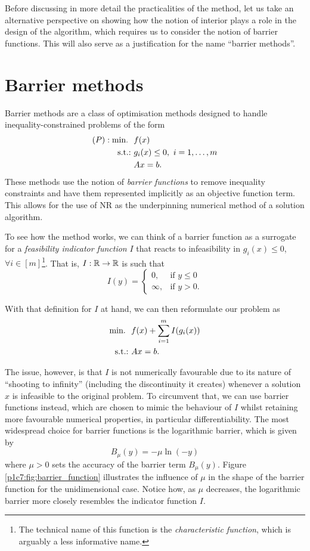Before discussing in more detail the practicalities of the method, let us take an alternative perspective on showing how the notion of interior plays a role in the design of the algorithm, which requires us to consider the notion of barrier functions. This will also serve as a justification for the name ``barrier methods''. 
	
	
\section{Barrier methods}


Barrier methods are a class of optimisation methods designed to handle inequality-constrained problems of the form
	\begin{align*}
	(P) : \mathop{\text{min.~}} \ & f(x) \\
	\mathop{\text{s.t.:~}} & g_i(x) \leq 0, \ i = 1,\dots,m \\
	& Ax = b. 
	\end{align*}
	These methods use the notion of \emph{barrier functions} to remove inequality constraints and have them represented implicitly as an objective function term. This allows for the use of NR as the underpinning numerical method of a solution algorithm. 
	
To see how the method works, we can think of a barrier function as a surrogate for a \emph{feasibility indicator function} $I$ that reacts to infeasibility in $g_i(x) \leq 0$, $\forall i \in  [m]$\footnote{The technical name of this function is the \emph{characteristic function}, which is arguably a less informative name.}. That is, $I : \mathbb{R} \to \mathbb{R}$ is such that
	\begin{equation*}
	I(y) = \begin{cases} 0, &\text{if } y \leq 0 \\
	                     \infty, &\text{if } y > 0.  
	       \end{cases}
	\end{equation*} 

With that definition for $I$ at hand, we can then reformulate our problem as	
	\begin{align*}
		\mathop{\text{min.~}} \ & f(x) + \sum_{i=1}^m I(g_i(x)) \\
		\mathop{\text{s.t.:~}} &Ax = b. 
	\end{align*}
	
The issue, however, is that $I$ is not numerically favourable due to its nature of ``shooting to infinity'' (including the discontinuity it creates) whenever a solution $x$ is infeasible to the original problem. To circumvent that, we can use barrier functions instead, which are chosen to mimic the behaviour of $I$ whilst retaining more favourable numerical properties, in particular differentiability. The most widespread choice for barrier functions is the logarithmic barrier, which is given by
	\begin{equation*}
		B_\mu(y) = -\mu \ln(-y)
	\end{equation*}
	where $\mu > 0$ sets the accuracy of the barrier term $B_\mu(y)$. Figure \ref{p1c7:fig:barrier_function} illustrates the influence of $\mu$ in the shape of the barrier function for the unidimensional case. Notice how, as $\mu$ decreases, the logarithmic barrier more closely resembles the indicator function $I$.
	

